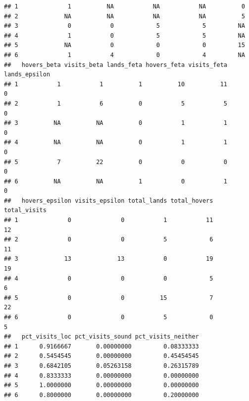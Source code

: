 \documentclass[]{article}
\newenvironment{Shaded}{\begin{snugshade}}{\end{snugshade}}
\newcommand{\KeywordTok}[1]{\textcolor[rgb]{0.13,0.29,0.53}{\textbf{{#1}}}}
\newcommand{\StringTok}[1]{\textcolor[rgb]{0.31,0.60,0.02}{{#1}}}
\newcommand{\CommentTok}[1]{\textcolor[rgb]{0.56,0.35,0.01}{\textit{{#1}}}}
\newcommand{\NormalTok}[1]{{#1}}
\begin{document}
\begin{verbatim}
## 1              1          NA           NA           NA          0
## 2             NA          NA           NA           NA          5
## 3              0           0            5            5         NA
## 4              1           0            5            5         NA
## 5             NA           0            0            0         15
## 6              1           4            0            4         NA
##   hovers_beta visits_beta lands_feta hovers_feta visits_feta lands_epsilon
## 1           1           1          1          10          11             0
## 2           1           6          0           5           5             0
## 3          NA          NA          0           1           1             0
## 4          NA          NA          0           1           1             0
## 5           7          22          0           0           0             0
## 6          NA          NA          1           0           1             0
##   hovers_epsilon visits_epsilon total_lands total_hovers total_visits
## 1              0              0           1           11           12
## 2              0              0           5            6           11
## 3             13             13           0           19           19
## 4              0              0           0            5            6
## 5              0              0          15            7           22
## 6              0              0           5            0            5
##   pct_visits_loc pct_visits_sound pct_visits_neither
## 1      0.9166667       0.00000000         0.08333333
## 2      0.5454545       0.00000000         0.45454545
## 3      0.6842105       0.05263158         0.26315789
## 4      0.8333333       0.00000000         0.00000000
## 5      1.0000000       0.00000000         0.00000000
## 6      0.8000000       0.00000000         0.20000000
\end{verbatim}

\begin{Shaded}
\end{Shaded}
\end{document}
